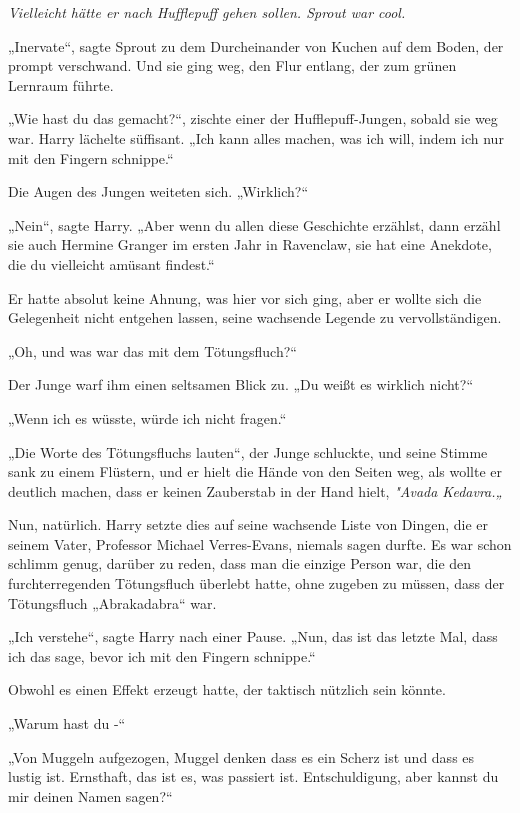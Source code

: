 {\emph{Vielleicht hätte er nach Hufflepuff gehen sollen. Sprout war cool.}

„Inervate“, sagte Sprout zu dem Durcheinander von Kuchen auf dem Boden, der prompt verschwand. Und sie ging weg, den Flur entlang, der zum grünen Lernraum führte.

„Wie hast du das gemacht?“, zischte einer der Hufflepuff-Jungen, sobald sie weg war. Harry lächelte süffisant. „Ich kann alles machen, was ich will, indem ich nur mit den Fingern schnippe.“

Die Augen des Jungen weiteten sich. „Wirklich?“

„Nein“, sagte Harry. „Aber wenn du allen diese Geschichte erzählst, dann erzähl sie auch Hermine Granger im ersten Jahr in Ravenclaw, sie hat eine Anekdote, die du vielleicht amüsant findest.“

Er hatte absolut keine Ahnung, was hier vor sich ging, aber er wollte sich die Gelegenheit nicht entgehen lassen, seine wachsende Legende zu vervollständigen.

„Oh, und was war das mit dem Tötungsfluch?“

Der Junge warf ihm einen seltsamen Blick zu. „Du weißt es wirklich nicht?“

„Wenn ich es wüsste, würde ich nicht fragen.“

„Die Worte des Tötungsfluchs lauten“, der Junge schluckte, und seine Stimme sank zu einem Flüstern, und er hielt die Hände von den Seiten weg, als wollte er deutlich machen, dass er keinen Zauberstab in der Hand hielt, \emph{"Avada Kedavra.„}

Nun, natürlich. Harry setzte dies auf seine wachsende Liste von Dingen, die er seinem Vater, Professor Michael Verres-Evans, niemals sagen durfte. Es war schon schlimm genug, darüber zu reden, dass man die einzige Person war, die den furchterregenden Tötungsfluch überlebt hatte, ohne zugeben zu müssen, dass der Tötungsfluch „Abrakadabra“ war.

„Ich verstehe“, sagte Harry nach einer Pause. „Nun, das ist das letzte Mal, dass ich das sage, bevor ich mit den Fingern schnippe.“

Obwohl es einen Effekt erzeugt hatte, der taktisch nützlich sein könnte.

„Warum hast du -“

„Von Muggeln aufgezogen, Muggel denken dass es ein Scherz ist und dass es lustig ist. Ernsthaft, das ist es, was passiert ist. Entschuldigung, aber kannst du mir deinen Namen sagen?“

}
